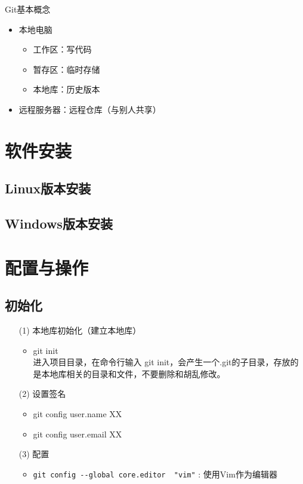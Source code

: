 Git基本概念
\begin{itemize}
\item 本地电脑
\begin{itemize}
\item 工作区：写代码
\item 暂存区：临时存储
\item 本地库：历史版本
\end{itemize}

\item 远程服务器：远程仓库（与别人共享）
\end{itemize}






\section{软件安装}
\subsection{Linux版本安装}
\subsection{Windows版本安装}


\section{配置与操作}
\subsection{初始化}
\begin{itemize}
\item[(1)] 本地库初始化（建立本地库）
\begin{itemize}
\item git init\\
进入项目目录，在命令行输入 git init，会产生一个.git的子目录，存放的是本地库相关的目录和文件，不要删除和胡乱修改。
\end{itemize}

\item[(2)] 设置签名
\begin{itemize}
\item git config user.name XX
\item git config user.email XX
\end{itemize}

\item [(3)] 配置
\begin{itemize}
\item \verb|git config --global core.editor  "vim"| : 使用Vim作为编辑器
\end{itemize}

\end{itemize}



